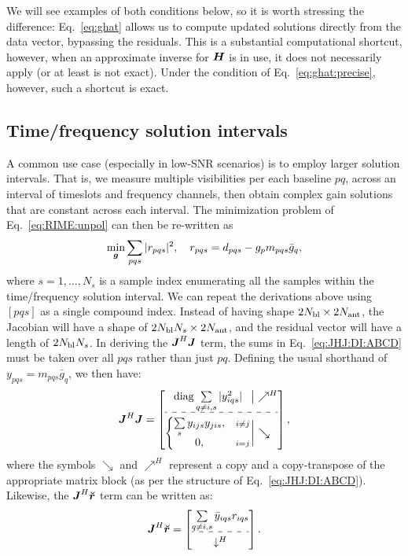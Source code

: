 \documentclass[useAMS,usenatbib]{mn2e}
\makeatletter
\newcommand{\mat}[1]{{\bmath{#1}}}
\newcommand{\JJ}{\mat{J}} %
\newcommand{\HH}{\mat{H}} %
\newcommand{\JHJ}{\JJ^H\JJ} %
\newcommand{\Matrix}[2]{\left [ \begin{array}{@{}#1@{}}#2\end{array} \right ]}
\newcommand{\AUG}[1]{\bmath{\breve{#1}}}
\newcommand{\Rr}{\AUG{r}}
\numberwithin{equation}{section}
\makeatother
\begin{document}
We will see examples of both conditions below, so it is worth stressing the difference: Eq.~\ref{eq:ghat}
allows us to compute updated solutions directly from the data vector, bypassing the residuals. This is a 
substantial computational shortcut, however, when an approximate inverse for $\HH$ is in use, it 
does not necessarily apply (or at least is not exact). Under the condition of Eq.~\ref{eq:ghat:precise}, however, 
such a shortcut is exact.


\subsection{Time/frequency solution intervals}
\label{sec:unpol:DI:avg}
\label{sec:solution-intervals}

\newcommand{\Ns}{N_s}

A common use case (especially in low-SNR scenarios) is to employ larger solution intervals. 
That is, we measure multiple visibilities per each baseline $pq$, across an interval of timeslots and
frequency channels, then obtain complex gain solutions that are constant across each interval. The 
minimization problem of Eq.~\ref{eq:RIME:unpol} can then be re-written as
\begin{equation}
\label{eq:cal:DI:tf}
\min_{\bmath{g}}\sum_{pqs}|r_{pqs}|^2, 
~~~r_{pqs} = d_{pqs}-g_p m_{pqs} \bar{g}_q, 
\end{equation}
where $s=1,...,N_s$ is a sample index enumerating all the samples within the 
time/frequency solution interval. We can repeat the derivations above using  $[pqs]$ as a
single compound index. Instead of having shape $2N_\mathrm{bl}\times2N_\mathrm{ant}$, the Jacobian 
will have a shape of $2\Nbl\Ns\times 2\Na$, and the residual vector will have a length of 
$2\Nbl\Ns$. In deriving the $\JHJ$ term, the sums in Eq.~\ref{eq:JHJ:DI:ABCD} must be taken over all $pqs$ 
rather than just $pq$. Defining the usual shorthand of 
$y_{pqs}=m_{pqs}\bar{g}_q$, we then have:
\begin{equation}
\label{eq:JHJ:DI:tf}
\JJ^H \JJ = 
\JHJblocks{
  \mathrm{diag} \sum\limits_{q\ne i,s} |y^2_{iqs}| 
}{
  \left \{ 
  \begin{array}{@{}cc@{}}
   \sum\limits_{s} y_{ijs}y_{jis},&{\scriptstyle i\ne j} \\
   0, &{\scriptstyle i=j}
  \end{array} \right . 
},
\end{equation}
where the symbols $\searrow$ and $\nearrow^H$ represent a copy and a copy-transpose of the appropriate matrix 
block (as per the structure of Eq.~\ref{eq:JHJ:DI:ABCD}). Likewise, the $\JJ^H\Rr$ term can be written as:
\begin{equation}
\label{eq:JHR:DI:tf}
\JJ^H\Rr 
= \Matrix{c}{
\sum\limits_{q\ne i,s} \bar{y}_{iqs} r_{iqs}   \\
 \hdashline \\[-8pt]
\downarrow^H
}.
\end{equation}
\end{document}
